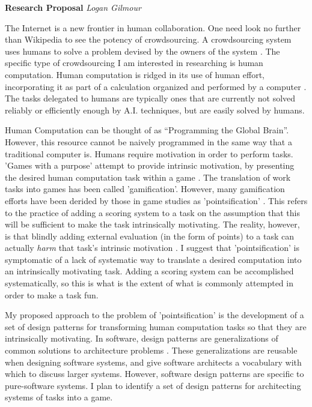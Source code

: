 \documentclass{article}
\begin{document}
\noindent \hfill \textbf{Research Proposal} \hfill \textit{Logan Gilmour}

The Internet is a new frontier in human collaboration. One need look no further than Wikipedia to see the potency of crowdsourcing. A crowdsourcing system uses humans to solve a problem devised by the owners of the system \cite{Doan:2011:CSW:1924421.1924442}. The specific type of crowdsourcing I am interested in researching is human computation. Human computation is ridged in its use of human effort, incorporating it as part of a calculation organized and performed by a computer \cite{Quinn:2011:HCS:1978942.1979148}. The tasks delegated to humans are typically ones that are currently not solved reliably or efficiently enough by A.I. techniques, but are easily solved by humans. 


Human Computation can be thought of as ``Programming the Global Brain''\cite{Bernstein:2012:PGB:2160718.2160731}. However, this resource cannot be naively programmed in the same way that a traditional computer is. Humans require motivation in order to perform tasks. 'Games with a purpose' attempt to provide intrinsic motivation, by presenting the desired human computation task within a game \cite{von2009human}. The translation of work tasks into games has been called 'gamification'. However, many gamification efforts have been derided by those in game studies as 'pointsification' \cite{nicholson2012user}. This refers to the practice of adding a scoring system to a task on the assumption that this will be sufficient to make the task intrinsically motivating. The reality, however, is that blindly adding external evaluation (in the form of points) to a task can actually \textit{harm} that task's intrinsic motivation \cite{nicholson2012user}. I suggest that 'pointsification' is symptomatic of a lack of systematic way to translate a desired computation into an intrinsically motivating task. Adding a scoring system can be accomplished systematically, so this is what is the extent of what is commonly attempted in order to make a task fun.

My proposed approach to the problem of 'pointsification' is the development of a set of design patterns for transforming human computation tasks so that they are intrinsically motivating. In software, design patterns are generalizations of common solutions to architecture problems \cite{wolfgang1994design}. These generalizations are reusable when designing software systems, and give software architects a vocabulary with which to discuss larger systems. However, software design patterns are specific to pure-software systems. I plan to identify a set of design patterns for architecting systems of tasks into a game.
\end{document}

